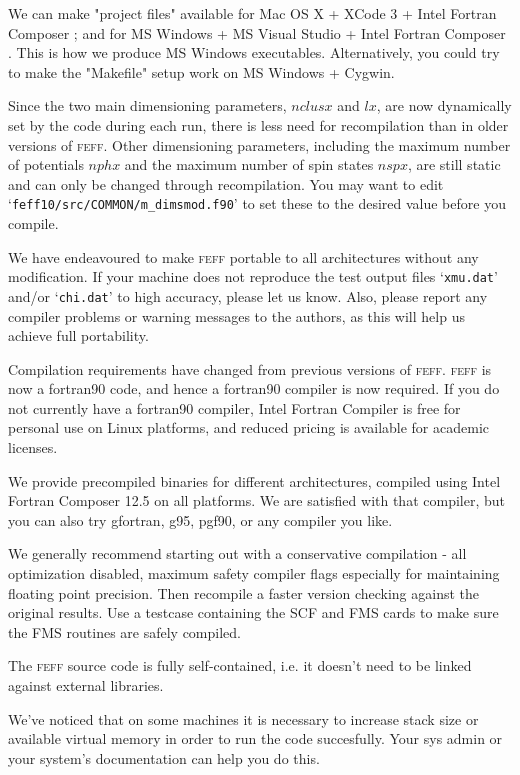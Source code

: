 \documentclass[11pt,oneside]{report} %
\newcommand{\program}[1]{\textsc{#1}}
\newcommand{\feff}{\program{feff}}
\newcommand{\file}[1]{`\texttt{#1}'}
\begin{document}
\begin{latexonly}
We can make "project files" available for Mac OS X + XCode 3 + Intel Fortran Composer ; and for MS Windows + MS Visual Studio + Intel Fortran Composer .  This is how we produce MS Windows executables.  Alternatively, you could try to make the "Makefile" setup work on MS Windows + Cygwin.

Since the two main dimensioning parameters, $nclusx$ and $lx$, are now dynamically set by the code during each run, there is less need for recompilation
than in older versions of {\feff}.  Other dimensioning parameters, including the maximum number of potentials $nphx$ and the maximum number of spin
states $nspx$, are still static and can only be changed through recompilation.  You may want to edit \file{feff10/src/COMMON/m\_dimsmod.f90} to set these to the desired value before you compile.

We have endeavoured to make {\feff} portable to all architectures without any modification. 
If your machine does not reproduce the test output files \file{xmu.dat}
and/or \file{chi.dat} to high accuracy,
please let us know. Also, please report any compiler problems or warning
messages to the authors, as this will help us achieve full portability.

Compilation requirements have changed from previous versions of {\feff}.  {\feff} is now a fortran90 code, and hence a fortran90 compiler is now required.  If you do not currently have a fortran90 compiler, Intel Fortran Compiler is free for personal use on Linux platforms, and reduced pricing is available for academic licenses.  

We provide precompiled binaries for different architectures, compiled using Intel Fortran Composer 12.5 on all platforms.  We are satisfied with that compiler, but you can also try gfortran, g95, pgf90, or any compiler you like.

We generally recommend starting out with a conservative compilation - all optimization disabled,
maximum safety compiler flags especially for maintaining floating point precision.  Then recompile a
faster version checking against the original results.  Use a testcase containing the SCF and FMS cards
to make sure the FMS routines are safely compiled.

The {\feff} source code is fully self-contained, i.e. it doesn't need to be linked against external libraries.

We've noticed that on some machines it is necessary to increase stack size or available virtual memory
in order to run the code succesfully.  Your sys admin or your system's documentation can help you do this.



\end{latexonly}
\end{document}
